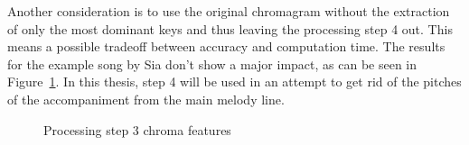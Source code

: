 \begin{figure}[htbp]
	\centering
\end{figure}

\noindent Another consideration is to use the original chromagram without the extraction of only the most dominant keys and thus leaving the processing step 4 out. This means a possible tradeoff between accuracy and computation time. The results for the example song by Sia don't show a major impact, as can be seen in Figure~\ref{fig:nomax}. In this thesis, step 4 will be used in an attempt to get rid of the pitches of the accompaniment from the main melody line.
\begin{figure}[htbp]
	\centering
	\caption{Processing step 3 chroma features}
	\label{fig:nomax}
\end{figure}

